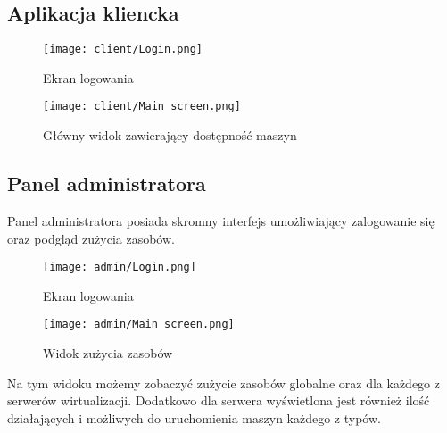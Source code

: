 \documentclass[../../deliverable-two.tex]{subfiles}
\begin{document}
\subsection{Aplikacja kliencka}

\begin{figure}[h!]
  \centering\texttt{[image: client/Login.png]}
  \caption{Ekran logowania}
\end{figure}

\begin{figure}[h!]
  \centering\texttt{[image: client/Main screen.png]}
  \caption{Główny widok zawierający dostępność maszyn}
\end{figure}

\subsection{Panel administratora}

Panel administratora posiada skromny interfejs umożliwiający zalogowanie się oraz podgląd zużycia zasobów.

\begin{figure}[h!]
  \centering\texttt{[image: admin/Login.png]}
  \caption{Ekran logowania}
\end{figure}

\begin{figure}[h!]
  \centering\texttt{[image: admin/Main screen.png]}
  \caption{Widok zużycia zasobów}
\end{figure}

Na tym widoku możemy zobaczyć zużycie zasobów globalne oraz dla każdego z serwerów wirtualizacji. Dodatkowo dla serwera wyświetlona jest również ilość działających i możliwych do uruchomienia maszyn każdego z typów.
\end{document}
